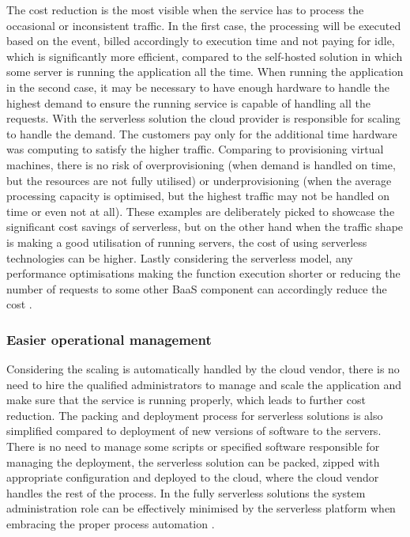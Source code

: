 The cost reduction is the most visible when the service has to process the occasional or inconsistent traffic. In the first case, the processing will be executed based on the event, billed accordingly to execution time and not paying for idle, which is significantly more efficient, compared to the self-hosted solution in which some server is running the application all the time. When running the application in the second case, it may be necessary to have enough hardware to handle the highest demand to ensure the running service is capable of handling all the requests. With the serverless solution the cloud provider is responsible for scaling to handle the demand. The customers pay only for the additional time hardware was computing to satisfy the higher traffic. Comparing to provisioning virtual machines, there is no risk of overprovisioning (when demand is handled on time, but the resources are not fully utilised) or underprovisioning (when the average processing capacity is optimised, but the highest traffic may not be handled on time or even not at all). These examples are deliberately picked to showcase the significant cost savings of serverless, but on the other hand when the traffic shape is making a good utilisation of running servers, the cost of using serverless technologies can be higher. Lastly considering the serverless model, any performance optimisations making the function execution shorter or reducing the number of requests to some other BaaS component can accordingly reduce the cost \cite{MartinFowlerServerless}.

\subsubsection*{Easier operational management}

Considering the scaling is automatically handled by the cloud vendor, there is no need to hire the qualified administrators to manage and scale the application and make sure that the service is running properly, which leads to further cost reduction. The packing and deployment process for serverless solutions is also simplified compared to deployment of new versions of software to the servers. There is no need to manage some scripts or specified software responsible for managing the deployment, the serverless solution can be packed, zipped with appropriate configuration and deployed to the cloud, where the cloud vendor handles the rest of the process. In the fully serverless solutions the system administration role can be effectively minimised by the serverless platform when embracing the proper process automation \cite{MartinFowlerServerless}.

